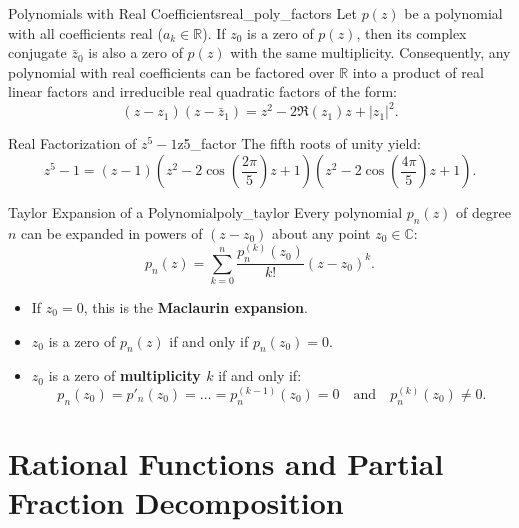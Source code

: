 \begin{proposition}{Polynomials with Real Coefficients}{real_poly_factors}
Let $p(z)$ be a polynomial with all coefficients real ($a_k \in \mathbb{R}$). If $z_0$ is a zero of $p(z)$, then its complex conjugate $\bar{z}_0$ is also a zero of $p(z)$ with the same multiplicity.
Consequently, any polynomial with real coefficients can be factored over $\mathbb{R}$ into a product of real linear factors and irreducible real quadratic factors of the form:
\begin{equation}
(z - z_1)(z - \bar{z}_1) = z^2 - 2\Re(z_1)z + |z_1|^2.
\end{equation}
\end{proposition}

\begin{example}{Real Factorization of $z^5 - 1$}{z5_factor}
The fifth roots of unity yield:
\begin{equation}
z^5 - 1 = (z - 1)\left(z^2 - 2\cos\left(\frac{2\pi}{5}\right)z + 1\right)\left(z^2 - 2\cos\left(\frac{4\pi}{5}\right)z + 1\right).
\end{equation}
\end{example}

\begin{theorem}{Taylor Expansion of a Polynomial}{poly_taylor}
Every polynomial $p_n(z)$ of degree $n$ can be expanded in powers of $(z - z_0)$ about any point $z_0 \in \mathbb{C}$:
\begin{equation}
p_n(z) = \sum_{k=0}^n \frac{p_n^{(k)}(z_0)}{k!} (z - z_0)^k.
\end{equation}
\begin{itemize}
    \item If $z_0 = 0$, this is the \textbf{Maclaurin expansion}.
    \item $z_0$ is a zero of $p_n(z)$ if and only if $p_n(z_0) = 0$.
    \item $z_0$ is a zero of \textbf{multiplicity $k$} if and only if:
    \begin{equation}
    p_n(z_0) = p'_n(z_0) = \dots = p_n^{(k-1)}(z_0) = 0 \quad \text{and} \quad p_n^{(k)}(z_0) \neq 0.
    \end{equation}
\end{itemize}
\end{theorem}


\section{Rational Functions and Partial Fraction Decomposition}

